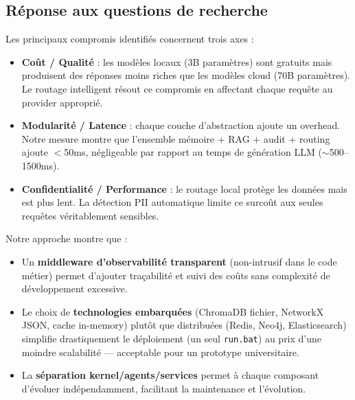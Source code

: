\documentclass[12pt, a4paper]{article}
\begin{document}
\subsection{Réponse aux questions de recherche}

\begin{importantbox}
Les principaux compromis identifiés concernent trois axes :
\begin{itemize}
  \item \textbf{Coût / Qualité} : les modèles locaux (3B paramètres) sont gratuits mais produisent des réponses moins riches que les modèles cloud (70B paramètres). Le routage intelligent résout ce compromis en affectant chaque requête au provider approprié.
  \item \textbf{Modularité / Latence} : chaque couche d'abstraction ajoute un overhead. Notre mesure montre que l'ensemble mémoire + RAG + audit + routing ajoute $<$50ms, négligeable par rapport au temps de génération LLM ($\sim$500--1500ms).
  \item \textbf{Confidentialité / Performance} : le routage local protège les données mais est plus lent. La détection PII automatique limite ce surcoût aux seules requêtes véritablement sensibles.
\end{itemize}
\end{importantbox}

\begin{importantbox}
Notre approche montre que :
\begin{itemize}
  \item Un \textbf{middleware d'observabilité transparent} (non-intrusif dans le code métier) permet d'ajouter traçabilité et suivi des coûts sans complexité de développement excessive.
  \item Le choix de \textbf{technologies embarquées} (ChromaDB fichier, NetworkX JSON, cache in-memory) plutôt que distribuées (Redis, Neo4j, Elasticsearch) simplifie drastiquement le déploiement (un seul \texttt{run.bat}) au prix d'une moindre scalabilité — acceptable pour un prototype universitaire.
  \item La \textbf{séparation kernel/agents/services} permet à chaque composant d'évoluer indépendamment, facilitant la maintenance et l'évolution.
\end{itemize}
\end{importantbox}
\end{document}
